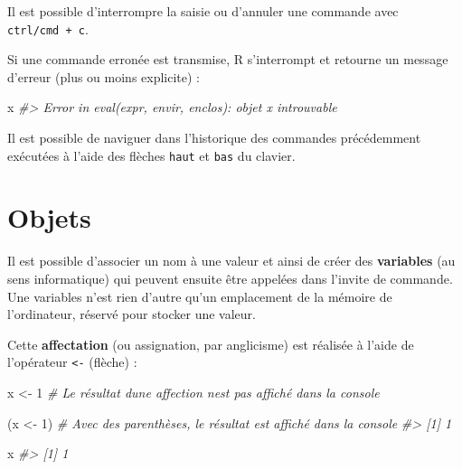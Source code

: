 \documentclass[
  french,
]{scrbook}
\newenvironment{Shaded}{\begin{snugshade}}{\end{snugshade}}
\newcommand{\CommentTok}[1]{\textcolor[rgb]{0.56,0.35,0.01}{\textit{#1}}}
\newcommand{\DecValTok}[1]{\textcolor[rgb]{0.00,0.00,0.81}{#1}}
\newcommand{\NormalTok}[1]{#1}
\newcommand{\OtherTok}[1]{\textcolor[rgb]{0.56,0.35,0.01}{#1}}
\begin{document}
\begin{tcolorbox}[fonttitle=\sffamily\bfseries\large,title=Conseil,colframe=darkcyan]

Il est possible d'interrompre la saisie ou d'annuler une commande avec \texttt{ctrl/cmd\ +\ c}.

\end{tcolorbox}

Si une commande erronée est transmise, R s'interrompt et retourne un message d'erreur (plus ou moins explicite) :

\begin{Shaded}
\begin{Highlighting}[]
\NormalTok{x}
\CommentTok{\#\textgreater{} Error in eval(expr, envir, enclos): objet \textquotesingle{}x\textquotesingle{} introuvable}
\end{Highlighting}
\end{Shaded}

\begin{tcolorbox}[fonttitle=\sffamily\bfseries\large,title=Conseil,colframe=darkcyan]

Il est possible de naviguer dans l'historique des commandes précédemment exécutées à l'aide des flèches \texttt{haut} et \texttt{bas} du clavier.

\end{tcolorbox}

\hypertarget{objets}{%
\section{Objets}\label{objets}}

Il est possible d'associer un nom à une valeur et ainsi de créer des \textbf{variables} (au sens informatique) qui peuvent ensuite être appelées dans l'invite de commande. Une variables n'est rien d'autre qu'un emplacement de la mémoire de l'ordinateur, réservé pour stocker une valeur.

Cette \textbf{affectation} (ou assignation, par anglicisme) est réalisée à l'aide de l'opérateur \texttt{\textless{}-} (flèche) :

\begin{Shaded}
\begin{Highlighting}[]
\NormalTok{x }\OtherTok{\textless{}{-}} \DecValTok{1} \CommentTok{\# Le résultat d\textquotesingle{}une affection n\textquotesingle{}est pas affiché dans la console}

\NormalTok{(x }\OtherTok{\textless{}{-}} \DecValTok{1}\NormalTok{) }\CommentTok{\# Avec des parenthèses, le résultat est affiché dans la console}
\CommentTok{\#\textgreater{} [1] 1}

\NormalTok{x}
\CommentTok{\#\textgreater{} [1] 1}
\end{Highlighting}
\end{Shaded}
\end{document}
